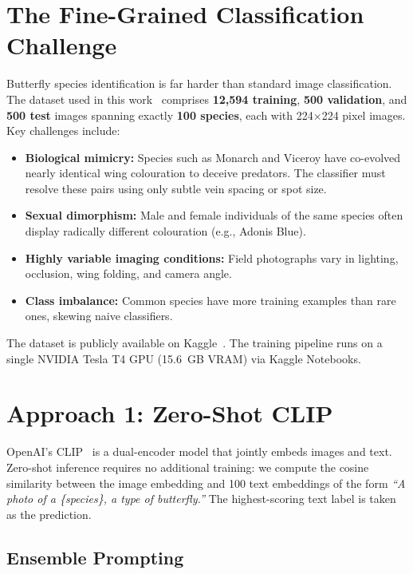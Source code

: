 \documentclass[journal, twocolumn]{IEEEtran}
\begin{document}
\section{The Fine-Grained Classification Challenge}

Butterfly species identification is far harder than standard image classification. The dataset used in this work~\cite{gpiosenka} comprises \textbf{12,594 training}, \textbf{500 validation}, and \textbf{500 test} images spanning exactly \textbf{100 species}, each with 224$\times$224 pixel images. Key challenges include:

\begin{itemize}
    \item \textbf{Biological mimicry:} Species such as Monarch and Viceroy have co-evolved nearly identical wing colouration to deceive predators. The classifier must resolve these pairs using only subtle vein spacing or spot size.
    \item \textbf{Sexual dimorphism:} Male and female individuals of the same species often display radically different colouration (e.g., Adonis Blue).
    \item \textbf{Highly variable imaging conditions:} Field photographs vary in lighting, occlusion, wing folding, and camera angle.
    \item \textbf{Class imbalance:} Common species have more training examples than rare ones, skewing naive classifiers.
\end{itemize}

The dataset is publicly available on Kaggle~\cite{gpiosenka}. The training pipeline runs on a single NVIDIA Tesla T4 GPU (15.6~GB VRAM) via Kaggle Notebooks.

\section{Approach 1: Zero-Shot CLIP}

OpenAI's CLIP~\cite{radford2021learning} is a dual-encoder model that jointly embeds images and text. Zero-shot inference requires no additional training: we compute the cosine similarity between the image embedding and 100 text embeddings of the form \emph{``A photo of a \{species\}, a type of butterfly.''} The highest-scoring text label is taken as the prediction.

\subsection{Ensemble Prompting}
\end{document}
